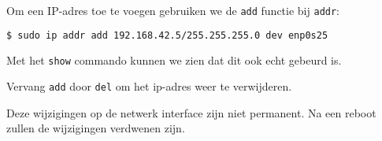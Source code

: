 Om een IP-adres toe te voegen gebruiken we de \texttt{add} functie bij \texttt{addr}:
\begin{lstlisting}[language=bash]
$ sudo ip addr add 192.168.42.5/255.255.255.0 dev enp0s25
\end{lstlisting}
Met het \texttt{show} commando kunnen we zien dat dit ook echt gebeurd is.

Vervang \texttt{add} door \texttt{del} om het ip-adres weer te verwijderen.

Deze wijzigingen op de netwerk interface zijn niet permanent. Na een reboot zullen de wijzigingen verdwenen zijn.

